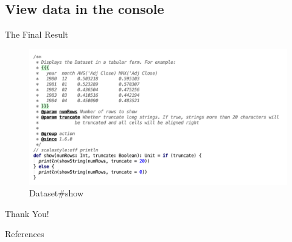 \subsection{View data in the console}
\begin{frame}[plain,t]{The Final Result} %
	 \\  
	\begin{figure}
		\centering
		\includegraphics[width=0.9\linewidth]{images/p010}
		\caption{Dataset\#show}
		\label{fig:p010}
	\end{figure}
	
\end{frame}





\begin{frame}[plain]
	\huge
	\vfill
	\centerline{  }
	\vfill

\end{frame}
\begin{frame}[plain]
	\huge
	\vfill
	\centerline{  }
	\vfill
	\Huge
	\centerline{\alert{Thank You!} }
	\vfill
\end{frame}

\begin{frame}{References}
\end{frame}  
 
